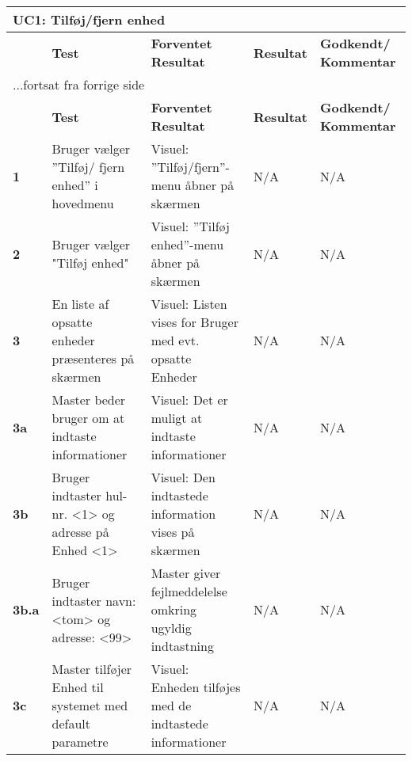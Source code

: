 \begin{center}
\begin{longtable}{|p{}|p{}|p{}|p{}|p{}|} %
\hline
\multicolumn{5}{|l|}{\textbf{UC1: Tilføj/fjern enhed}} \\ \hline
\multicolumn{1}{|c|}{} &
\textbf{Test} &
\textbf{Forventet \newline Resultat} &
\textbf{Resultat} &
\textbf{Godkendt/ \newline Kommentar} \\ \hline 
\endfirsthead

\multicolumn{5}{l}{...fortsat fra forrige side} \\ \hline 
\multicolumn{1}{|c|}{} &
\textbf{Test} &
\textbf{Forventet \newline Resultat} &
\textbf{Resultat} &
\textbf{Godkendt/ \newline Kommentar} \\ \hline 
\endhead


\textbf{1}	&Bruger vælger ''Tilføj/ fjern enhed'' i hovedmenu 
			&Visuel: ''Tilføj/fjern''-menu åbner på skærmen 
			&N/A 
			&N/A \\\hline
			 
\textbf{2}	&Bruger vælger "Tilføj enhed" 
			&Visuel: ''Tilføj enhed''-menu åbner på skærmen  
			&N/A 
			&N/A \\\hline
			 
\textbf{3}	&En liste af opsatte enheder præsenteres på skærmen
			&Visuel: Listen vises for Bruger med evt. opsatte Enheder
			&N/A 
			&N/A \\\hline
			 
\textbf{3a}	&Master beder bruger om at indtaste informationer
			&Visuel: Det er muligt at indtaste informationer
			&N/A
			&N/A \\\hline 
			
\textbf{3b}&Bruger indtaster hul-nr. <1> og adresse på Enhed <1>
			&Visuel: Den indtastede information vises på skærmen 
			&N/A 
			&N/A \\\hline
			 
\textbf{3b.a}&Bruger indtaster navn: <tom> og adresse: <99>
			&Master giver fejlmeddelelse omkring ugyldig indtastning
			&N/A 
			&N/A \\\hline
						 
\textbf{3c}&Master tilføjer Enhed til systemet med default parametre
			&Visuel: Enheden tilføjes med de indtastede informationer
			&N/A 
			&N/A \\\hline
			 

\end{longtable}
\end{center}
